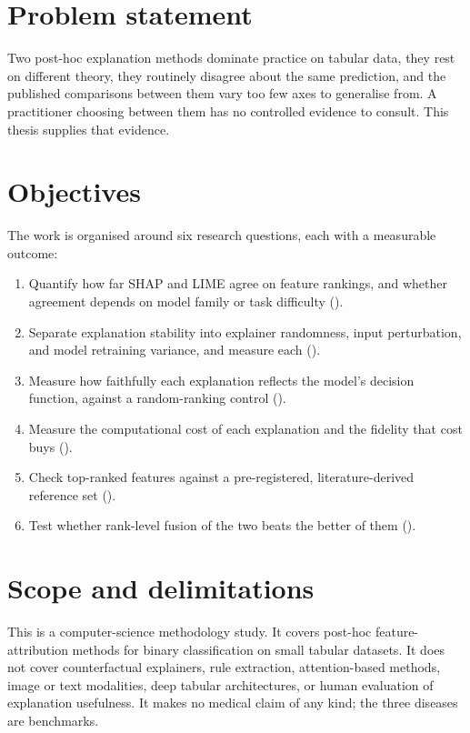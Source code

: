 \section{Problem statement}
Two post-hoc explanation methods dominate practice on tabular data, they rest on
different theory, they routinely disagree about the same prediction, and the published
comparisons between them vary too few axes to generalise from. A practitioner choosing
between them has no controlled evidence to consult. This thesis supplies that evidence.

\section{Objectives}
The work is organised around six research questions, each with a measurable outcome:

\begin{enumerate}
  \item[\textbf{O1}] Quantify how far SHAP and LIME agree on feature rankings, and
    whether agreement depends on model family or task difficulty ().
  \item[\textbf{O2}] Separate explanation stability into explainer randomness, input
    perturbation, and model retraining variance, and measure each ().
  \item[\textbf{O3}] Measure how faithfully each explanation reflects the model's
    decision function, against a random-ranking control ().
  \item[\textbf{O4}] Measure the computational cost of each explanation and the
    fidelity that cost buys ().
  \item[\textbf{O5}] Check top-ranked features against a pre-registered,
    literature-derived reference set ().
  \item[\textbf{O6}] Test whether rank-level fusion of the two beats the better of them
    ().
\end{enumerate}

\section{Scope and delimitations}
This is a computer-science methodology study. It covers post-hoc feature-attribution
methods for binary classification on small tabular datasets. It does not cover
counterfactual explainers, rule extraction, attention-based methods, image or text
modalities, deep tabular architectures, or human evaluation of explanation
usefulness. It makes no medical claim of any kind; the three diseases are benchmarks.

